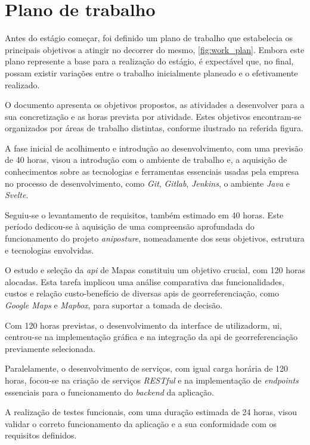 \chapter{Plano de trabalho}%
\label{chapter:work-plan}

Antes do estágio começar, foi definido um plano de trabalho que estabelecia os principais objetivos a atingir no decorrer do mesmo, \autoref{fig:work_plan}. Embora este plano represente a base para a realização do estágio, é expectável que, no final, possam existir variações entre o trabalho inicialmente planeado e o efetivamente realizado.

O documento apresenta os objetivos propostos, as atividades a desenvolver para a sua concretização e as horas prevista por atividade. Estes objetivos encontram-se organizados por áreas de trabalho distintas, conforme ilustrado na referida figura.

A fase inicial de acolhimento e introdução ao desenvolvimento, com uma previsão de 40 horas, visou a introdução com o ambiente de trabalho e, a aquisição de conhecimentos sobre as tecnologias e ferramentas essenciais usadas pela empresa no processo de desenvolvimento, como \textit{Git}, \textit{Gitlab}, \textit{Jenkins}, o ambiente \textit{Java} e \textit{Svelte}.

Seguiu-se o levantamento de requisitos, também estimado em 40 horas. Este período dedicou-se à aquisição de uma compreensão aprofundada do funcionamento do projeto \textit{aniposture}, nomeadamente dos seus objetivos, estrutura e tecnologias envolvidas.

O estudo e seleção da \textit{\acs{api}} de Mapas constituiu um objetivo crucial, com 120 horas alocadas. Esta tarefa implicou uma análise comparativa das funcionalidades, custos e relação custo-benefício de diversas \acs{api}s de georreferenciação, como \textit{Google Maps} e \textit{Mapbox}, para suportar a tomada de decisão.

Com 120 horas previstas, o desenvolvimento da interface de utilizadorm, \acs{ui}, centrou-se na implementação gráfica e na integração da \acs{api} de georreferenciação previamente selecionada.

Paralelamente, o desenvolvimento de serviços, com igual carga horária de 120 horas, focou-se na criação de serviços \textit{RESTful} e na implementação de \textit{endpoints} essenciais para o funcionamento do \textit{backend} da aplicação.

A realização de testes funcionais, com uma duração estimada de 24 horas, visou validar o correto funcionamento da aplicação e a sua conformidade com os requisitos definidos.

